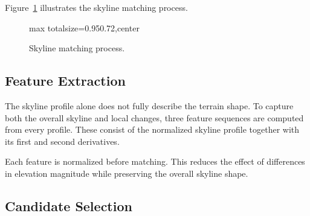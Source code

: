 Figure~\ref{fig:matching_pipeline} illustrates the skyline matching process.

\begin{figure}[H]
\centering
\begin{adjustbox}{max totalsize={0.95\textwidth}{0.72\textheight},center}
\end{adjustbox}
\caption{Skyline matching process.}
\label{fig:matching_pipeline}
\end{figure}

\subsection{Feature Extraction}

The skyline profile alone does not fully describe the terrain shape. To capture both the overall skyline and local changes, three feature sequences are computed from every profile. These consist of the normalized skyline profile together with its first and second derivatives.

Each feature is normalized before matching. This reduces the effect of differences in elevation magnitude while preserving the overall skyline shape.

\subsection{Candidate Selection}

